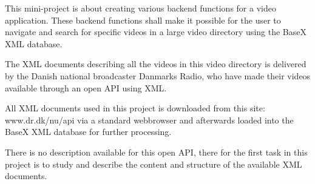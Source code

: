 This mini-project is about creating various backend functions for a video application. These backend functions shall make it possible for the user to navigate and search for specific videos in a large video directory using the BaseX XML database.

The XML documents describing all the videos in this video directory is delivered by the Danish national broadcaster Danmarks Radio, who have made their videos available through an open API using XML.

All XML documents used in this project is downloaded from this site: www.dr.dk/nu/api via a standard webbrowser and afterwards loaded into the BaseX XML database for further processing.

There is no description available for this open API, there for the first task in this project is to study and describe the content and structure of the available XML documents.
